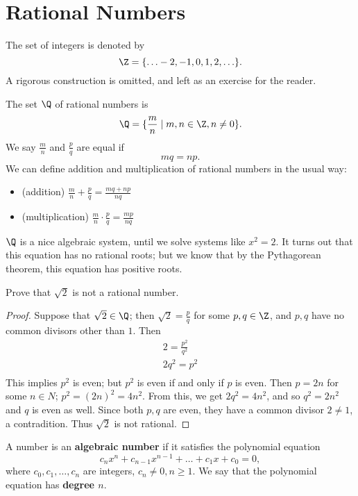 \documentclass[math1010-lecture-notes]{subfiles}
\begin{document}
\section{Rational Numbers}
\begin{definition}[Integers]{}
  The set of integers is denoted by \[
    \Z=\{ \ldots -2,-1,0,1,2,\ldots \}
  .\] 
  A rigorous construction is omitted, and left as an exercise for the reader.
\end{definition}

\begin{definition}{}
  The set $\Q$ of rational numbers is \[
    \Q = \{\frac{m}{n}\mid m,n\in \Z,n\neq 0\} 
  .\] We say $\frac{m}{n}$ and $\frac{p}{q}$ are equal if \[
  mq=np
  .\]  We can define addition and multiplication of rational numbers in the usual way:
  \begin{itemize}
    \item (addition) $\frac{m}{n}+\frac{p}{q}=\frac{mq+np}{nq}$ 
    \item (multiplication) $\frac{m}{n}\cdot \frac{p}{q} =  \frac{mp}{nq}$
  \end{itemize}
\end{definition}
$\Q$ is a nice algebraic system, until we solve systems like $x^2=2$. It turns out that this
equation has no rational roots; but we know that by the Pythagorean theorem, this equation has 
positive roots.

\begin{example}
  Prove that $\sqrt{2} $ is not a rational number.
\end{example}
\begin{proof}[Proof]
  Suppose that $\sqrt{2} \in \Q$; then $\sqrt{2} =\frac{p}{q}$ for some $p,q\in \Z$, and $p,q$ have
  no common divisors other than $1$. Then
  \begin{gather*}
    2 = \frac{p^2}{q^2}\\
    2q^2=p^2\\
  \end{gather*}
  This implies $p^2$ is even; but $p^2$ is even if and only if $p$ is even. Then $p=2n$ for some  $
  n \in N$; $p^2=\left( 2n \right) ^2=4n^2$. From this, we get $2q^2=4n^2$, and so $q^2=2n^2$ and
  $q$ is even as well. Since both $p,q$ are even, they have a common divisor
   $2\neq 1$, a contradition. Thus $ \sqrt{2} $ is not rational.
\end{proof}
\begin{proposition}{}
  A number is an \textbf{algebraic number} if it satisfies the polynomial equation \[
    c_nx^{n}+c_{n-1}x^{n-1}+\ldots+c_1x+c_0=0
  ,\] where $ c_0,c_1,\ldots, c_n$ are integers, $c_n \neq 0, n\ge 1$. We say that the polynomial
  equation has  \textbf{degree $n$}.
\end{proposition}
\end{document}
